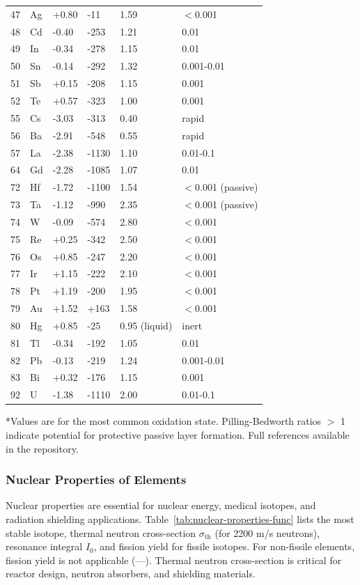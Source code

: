 \documentclass[12pt,a4paper]{article}
\begin{document}
\begin{longtable}{p{0.8cm}p{1.2cm}p{2.5cm}p{2.5cm}p{2.5cm}p{2.5cm}}
		47 & Ag & +0.80 & -11 & 1.59 & $<$0.001 \\
		48 & Cd & -0.40 & -253 & 1.21 & 0.01 \\
		49 & In & -0.34 & -278 & 1.15 & 0.01 \\
		50 & Sn & -0.14 & -292 & 1.32 & 0.001-0.01 \\
		51 & Sb & +0.15 & -208 & 1.15 & 0.001 \\
		52 & Te & +0.57 & -323 & 1.00 & 0.001 \\
		55 & Cs & -3.03 & -313 & 0.40 & rapid \\
		56 & Ba & -2.91 & -548 & 0.55 & rapid \\
		57 & La & -2.38 & -1130 & 1.10 & 0.01-0.1 \\
		64 & Gd & -2.28 & -1085 & 1.07 & 0.01 \\
		72 & Hf & -1.72 & -1100 & 1.54 & $<$0.001 (passive) \\
		73 & Ta & -1.12 & -990 & 2.35 & $<$0.001 (passive) \\
		74 & W  & -0.09 & -574 & 2.80 & $<$0.001 \\
		75 & Re & +0.25 & -342 & 2.50 & $<$0.001 \\
		76 & Os & +0.85 & -247 & 2.20 & $<$0.001 \\
		77 & Ir & +1.15 & -222 & 2.10 & $<$0.001 \\
		78 & Pt & +1.19 & -200 & 1.95 & $<$0.001 \\
		79 & Au & +1.52 & +163 & 1.58 & $<$0.001 \\
		80 & Hg & +0.85 & -25 & 0.95 (liquid) & inert \\
		81 & Tl & -0.34 & -192 & 1.05 & 0.01 \\
		82 & Pb & -0.13 & -219 & 1.24 & 0.001-0.01 \\
		83 & Bi & +0.32 & -176 & 1.15 & 0.001 \\
		92 & U  & -1.38 & -1110 & 2.00 & 0.01-0.1 \\
		\bottomrule
	\end{longtable}
	*Values are for the most common oxidation state. Pilling-Bedworth ratios $>$ 1 indicate potential for protective passive layer formation. Full references available in the repository.
	
	\subsubsection{Nuclear Properties of Elements}
	\label{subsec:nuclear-properties-func}
	
	Nuclear properties are essential for nuclear energy, medical isotopes, and radiation shielding applications. Table~\ref{tab:nuclear-properties-func} lists the most stable isotope, thermal neutron cross-section \(\sigma_{\text{th}}\) (for 2200 m/s neutrons), resonance integral \(I_0\), and fission yield for fissile isotopes. For non-fissile elements, fission yield is not applicable (---). Thermal neutron cross-section is critical for reactor design, neutron absorbers, and shielding materials.
	
\end{document}
